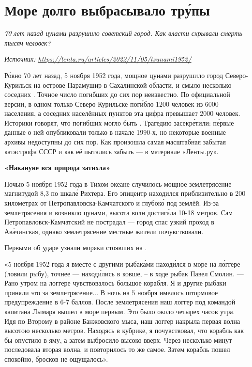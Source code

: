 
\section{Море долго выбрасывало тр\'{у}пы}

\textit{70 лет назад цунами разрушило советский город. Как власти скрывали смерть тысяч человек?}

\textit{Источник: \url{https://lenta.ru/articles/2022/11/05/tsunami1952/}}

Р\'{о}вно 70 лет назад, 5 ноября 1952 года, мощное цунами разрушило город Северо-Курильск на острове Парамушир в Сахалинской области, и смыло несколько соседних . Точное число погибших до сих пор неизвестно. По официальной версии, в одном только Северо-Курильске пог\'{и}бло 1200 человек из 6000 населения, а  соседних населённых пунктов эта цифра превышает 2000 человек. Историки говорят, что погибших могло быть . Трагедию засекр\'{е}тили: п\'{е}рвые данные о ней опубликовали только в начале 1990-х, но некоторые военные архивы недоступны до сих пор. Как произошла самая масштабная забытая катастрофа СССР и как её пытались забыть --- в материале «Ленты.ру».

\textbf{«Накануне вся природа затихла»}

Ночью 5 ноября 1952 года в Тихом океане случилось мощное землетрясение магнитудой 8,3 по шкал\'{е} Рихтера. Его эпицентр находился приблизительно в 200 километрах от Петропавловска-Камчатского и глубок\'{о} под землёй. Из-за землетрясения и возникло цунами, высота волн достиг\'{а}ла 10-18 метров. Сам Петропавловск-Камчатский не пострадал --- город спас узкий проход в  Ав\'{а}чинская, однако землетрясение местные жители почувствовали.

Первыми об ударе узнали моряки стоявших на  .

«5 ноября 1952 года я вместе с другими рыбак\'{а}ми наход\'{и}лся в море на л\'{о}ггере (ловили рыбу), точнее --- наход\'{и}лись в ковше, --  в ходе  рыбак Павел Смолин. --- Рано утром на логгере чувствовалось большое  корабля. Я и другие рыбаки приняли это за землетрясение... В ночь на 5 ноября имелось штормовое предупреждение в 6-7 баллов. После землетрясения наш логгер под командой капитана Лымаря вышел в море первым. Это было около четырех часов утра. Идя по Второму  в районе Банжовского мыса, наш логгер накрыла первая волна высотою несколько метров. Находясь в кубрике, я почувствовал, что корабль как бы опустило в яму, а затем выбросило высоко вверх. Через несколько минут последовала вторая волна, и повторилось то же самое. Затем корабль пошел спокойно, бросков не ощущалось».

